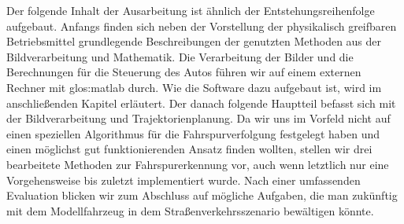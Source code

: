 Der folgende Inhalt der Ausarbeitung ist ähnlich der Entstehungsreihenfolge aufgebaut. Anfangs finden sich neben der Vorstellung der physikalisch greifbaren Betriebsmittel grundlegende Beschreibungen der genutzten Methoden aus der Bildverarbeitung und Mathematik. Die Verarbeitung der Bilder und die Berechnungen für die Steuerung des Autos führen wir auf einem externen Rechner mit \gls{glos:matlab} durch. Wie die Software dazu aufgebaut ist, wird im anschließenden Kapitel erläutert. Der danach folgende Hauptteil befasst sich mit der Bildverarbeitung und Trajektorienplanung. Da wir uns im Vorfeld nicht auf einen speziellen Algorithmus für die Fahrspurverfolgung festgelegt haben und einen möglichst gut funktionierenden Ansatz finden wollten, stellen wir drei bearbeitete Methoden zur Fahrspurerkennung vor, auch wenn letztlich nur eine Vorgehensweise bis zuletzt implementiert wurde. Nach einer umfassenden Evaluation blicken wir zum Abschluss auf mögliche Aufgaben, die man zukünftig mit dem Modellfahrzeug in dem Straßenverkehrsszenario bewältigen könnte.



